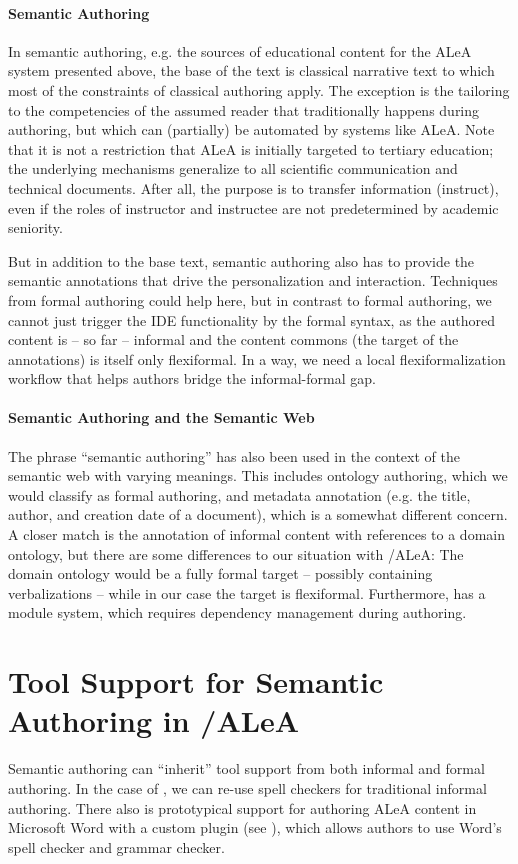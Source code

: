 \documentclass[runningheads]{llncs}
\newcommand\ALeA{\textsf{ALeA}\xspace}
\begin{document}
\paragraph{Semantic Authoring}
In semantic authoring, e.g. the \sTeX sources of educational content for the \ALeA system
presented above, the base of the text is classical narrative text to which most of the
constraints of classical authoring apply.
The exception is the tailoring to the competencies of the assumed reader
that traditionally happens during authoring, but which can (partially) be automated by systems like
\ALeA. Note that it is not a restriction that \ALeA is initially targeted to tertiary
education; the underlying mechanisms generalize to all scientific communication and
technical documents. After all, the purpose is to transfer information (instruct), even if
the roles of instructor and instructee are not predetermined by academic seniority.

But in addition to the base text, semantic authoring also has to provide the semantic
annotations that drive the personalization and interaction. Techniques from formal
authoring could help here, but in contrast to formal authoring, we cannot just trigger the
IDE functionality by the formal syntax, as the authored content is -- so far -- informal
and the content commons (the target of the annotations) is itself only flexiformal. In a
way, we need a local flexiformalization workflow that helps authors bridge the
informal-formal gap.

\paragraph{Semantic Authoring and the Semantic Web}
The phrase ``semantic authoring'' has also been used in the context of the semantic web with varying meanings.
This includes ontology authoring, which we would classify as formal authoring,
and metadata annotation (e.g. the title, author, and creation date of a document),
which is a somewhat different concern.
A closer match is the annotation of informal content with
references to a domain ontology,
but there are some differences to our situation with \sTeX/\ALeA:
The domain ontology would be a fully formal target
-- possibly containing verbalizations --
while in our case the target is flexiformal.
Furthermore, \sTeX has a module system, which requires
dependency management during authoring.






\section{Tool Support for Semantic Authoring in \sTeX/\ALeA}\label{sec:tools}
Semantic authoring can ``inherit'' tool support from both informal and formal authoring.
In the case of \sTeX, we can re-use spell checkers for traditional informal authoring.
There also is prototypical support for authoring \ALeA content in Microsoft Word
with a custom plugin (see \cite{KohKoh:woide24}),
which allows authors to use Word's spell checker and grammar checker.
\end{document}
